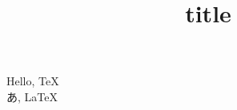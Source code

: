 \documentclass{article}
\begin{document}
\title{title}
\author{}
\date{}
Hello, \TeX\\
あ, \LaTeX \\
\end{document}
